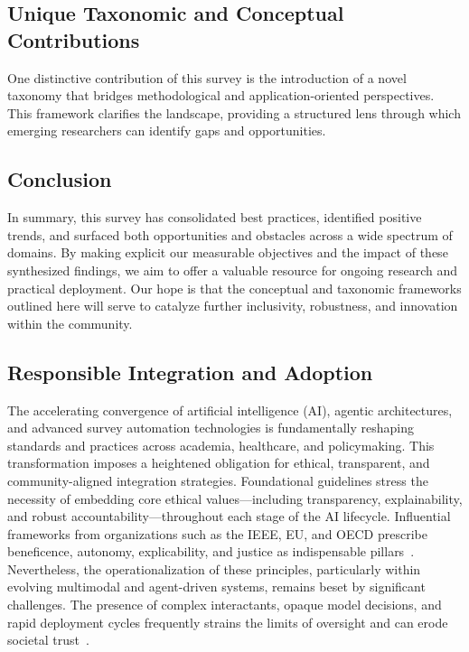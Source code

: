 \documentclass[sigconf]{acmart}
\begin{document}
\subsection{Unique Taxonomic and Conceptual Contributions}

One distinctive contribution of this survey is the introduction of a novel taxonomy that bridges methodological and application-oriented perspectives. This framework clarifies the landscape, providing a structured lens through which emerging researchers can identify gaps and opportunities.

\subsection{Conclusion}

In summary, this survey has consolidated best practices, identified positive trends, and surfaced both opportunities and obstacles across a wide spectrum of domains. By making explicit our measurable objectives and the impact of these synthesized findings, we aim to offer a valuable resource for ongoing research and practical deployment. Our hope is that the conceptual and taxonomic frameworks outlined here will serve to catalyze further inclusivity, robustness, and innovation within the community.

\subsection{Responsible Integration and Adoption}

The accelerating convergence of artificial intelligence (AI), agentic architectures, and advanced survey automation technologies is fundamentally reshaping standards and practices across academia, healthcare, and policymaking. This transformation imposes a heightened obligation for ethical, transparent, and community-aligned integration strategies. Foundational guidelines stress the necessity of embedding core ethical values—including transparency, explainability, and robust accountability—throughout each stage of the AI lifecycle. Influential frameworks from organizations such as the IEEE, EU, and OECD prescribe beneficence, autonomy, explicability, and justice as indispensable pillars~\cite{ref95,ref96,ref100,ref106,ref109,ref110}. Nevertheless, the operationalization of these principles, particularly within evolving multimodal and agent-driven systems, remains beset by significant challenges. The presence of complex interactants, opaque model decisions, and rapid deployment cycles frequently strains the limits of oversight and can erode societal trust~\cite{ref98,ref100,ref106}.
\end{document}

